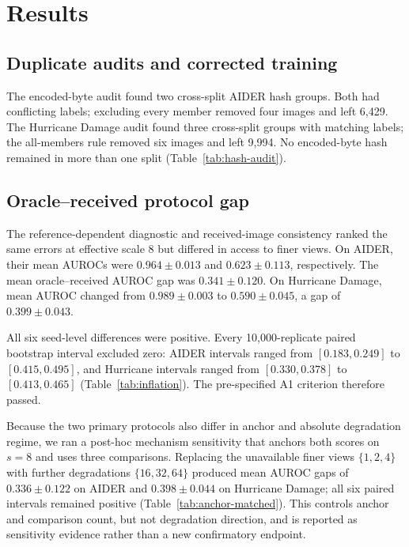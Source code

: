 \section{Results}

\subsection{Duplicate audits and corrected training}

The encoded-byte audit found two cross-split AIDER hash groups. Both had
conflicting labels; excluding every member removed four images and left 6,429.
The Hurricane Damage audit found three cross-split groups with matching labels;
the all-members rule removed six images and left 9,994. No encoded-byte hash
remained in more than one split (Table~\ref{tab:hash-audit}).



\subsection{Oracle--received protocol gap}

The reference-dependent diagnostic and received-image consistency ranked the
same errors at effective scale 8 but differed in access to finer views. On
AIDER, their mean AUROCs were \(0.964\pm0.013\) and \(0.623\pm0.113\),
respectively. The mean oracle--received AUROC gap was \(0.341\pm0.120\).
On Hurricane Damage, mean AUROC changed from \(0.989\pm0.003\) to
\(0.590\pm0.045\), a gap of \(0.399\pm0.043\).

All six seed-level differences were positive. Every 10,000-replicate paired
bootstrap interval excluded zero: AIDER intervals ranged from
\([0.183,0.249]\) to \([0.415,0.495]\), and Hurricane intervals ranged from
\([0.330,0.378]\) to \([0.413,0.465]\)
(Table~\ref{tab:inflation}). The pre-specified A1 criterion therefore passed.



Because the two primary protocols also differ in anchor and absolute
degradation regime, we ran a post-hoc mechanism sensitivity that anchors both
scores on \(s=8\) and uses three comparisons. Replacing the unavailable finer
views \(\{1,2,4\}\) with further degradations \(\{16,32,64\}\) produced mean
AUROC gaps of \(0.336\pm0.122\) on AIDER and \(0.398\pm0.044\) on Hurricane
Damage; all six paired intervals remained positive
(Table~\ref{tab:anchor-matched}). This controls anchor and comparison count,
but not degradation direction, and is reported as sensitivity evidence rather
than a new confirmatory endpoint.

